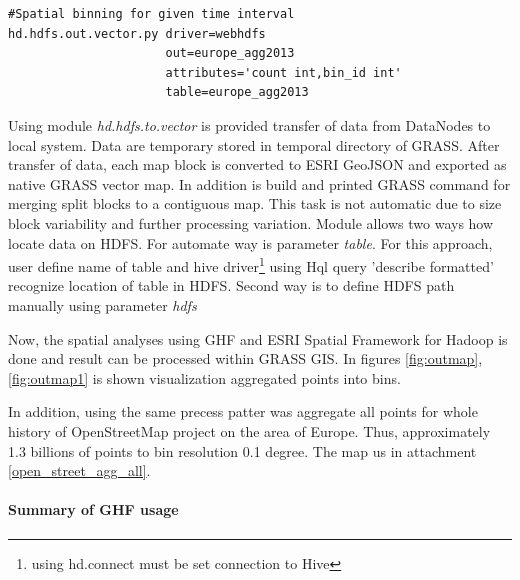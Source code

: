 \documentclass[a4paper,12pt,oneside]{report}
\begin{document}
\begin{footnotesize}
	\begin{lstlisting}[style=python]
#Spatial binning for given time interval
hd.hdfs.out.vector.py driver=webhdfs
                      out=europe_agg2013 
                      attributes='count int,bin_id int' 
                      table=europe_agg2013
	\end{lstlisting}
\end{footnotesize}
	Using module \textit{hd.hdfs.to.vector} is provided transfer of data from DataNodes to local system. Data are temporary stored in temporal directory of GRASS. After transfer of data, each 
	map block is converted to ESRI GeoJSON and exported as native GRASS vector map. In addition is build and printed GRASS command for merging split blocks to a contiguous map. This task is not automatic due to size block variability  and further processing variation. Module allows two
	 ways how locate data on HDFS. For automate way is parameter \textit{table}. For this approach, user
	 define name of table and hive driver\footnote{using hd.connect must be set connection to Hive} using Hql query 'describe formatted' recognize location of table in HDFS.
	 Second way is to define HDFS path manually using parameter \textit{hdfs}
	
	Now, the spatial analyses using GHF and ESRI Spatial Framework for Hadoop is done and result can be processed within GRASS GIS. In figures \ref{fig:outmap}, \ref{fig:outmap1} is shown visualization aggregated points into bins.
	

	 In addition, using the same precess patter was aggregate all points for whole history of OpenStreetMap project on the area of Europe. Thus, approximately 1.3 billions  of points  to bin  resolution 0.1 degree. The map us in attachment \ref{open_street_agg_all}. 

	
	
	
	\paragraph{Summary of GHF usage}

		
		
		
		
\end{document}

